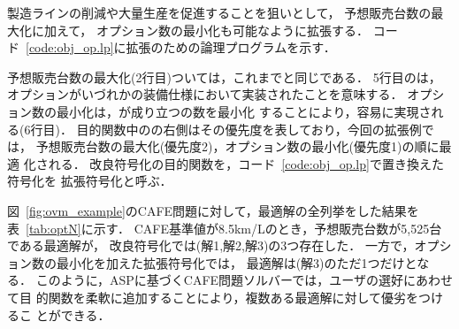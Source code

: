 製造ラインの削減や大量生産を促進することを狙いとして，
予想販売台数の最大化に加えて，
オプション数の最小化も可能なように拡張する．
コード~\ref{code:obj_op.lp}に拡張のための論理プログラムを示す．

予想販売台数の最大化(2行目)ついては，これまでと同じである．
5行目のは，
オプションがいづれかの装備仕様において実装されたことを意味する．
オプション数の最小化は，が成り立つの数を最小化
することにより，容易に実現される(6行目)．
目的関数中のの右側はその優先度を表しており，今回の拡張例では，
予想販売台数の最大化(優先度2)，オプション数の最小化(優先度1)の順に最適
化される．
改良符号化の目的関数を，コード~\ref{code:obj_op.lp}で置き換えた符号化を
拡張符号化と呼ぶ．

図~\ref{fig:ovm_example}のCAFE問題に対して，最適解の全列挙をした結果を
表~\ref{tab:optN}に示す．
CAFE基準値が8.5km/Lのとき，予想販売台数が5,525台である最適解が，
改良符号化では(解1,解2,解3)の3つ存在した．
一方で，オプション数の最小化を加えた拡張符号化では，
最適解は(解3)のただ1つだけとなる．
このように，ASPに基づくCAFE問題ソルバーでは，ユーザの選好にあわせて目
的関数を柔軟に追加することにより，複数ある最適解に対して優劣をつけるこ
とができる．


